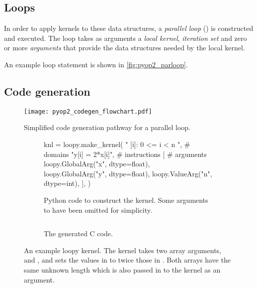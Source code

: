 \documentclass[thesis]{subfiles}
\begin{document}
\subsection{Loops}

In order to apply kernels to these data structures, a \textit{parallel loop} () is constructed and executed.
The loop takes as arguments a \textit{local kernel}, \textit{iteration set} and zero or more \textit{arguments} that provide the data structures needed by the local kernel.




An example loop statement is shown in \cref{fig:pyop2_parloop}.

\subsection{Code generation}
\label{sec:pyop2_codegen}

\begin{figure}
  \texttt{[image: pyop2\_codegen\_flowchart.pdf]}
  \caption{Simplified code generation pathway for a  parallel loop.}
  \label{fig:pyop2_codegen}
\end{figure}

\begin{figure}
  \centering
  \begin{subfigure}{.49\textwidth}
    \begin{pylisting}
      knl = loopy.make_kernel(
        "{ [i]: 0 <= i < n }",  # domains
        "y[i] = 2*x[i]",        # instructions
        [                       # arguments
          loopy.GlobalArg("x", dtype=float),
          loopy.GlobalArg("y", dtype=float),
          loopy.ValueArg("n", dtype=int),
        ],
      )
    \end{pylisting}
    \caption{Python code to construct the kernel. Some arguments to  have been omitted for simplicity.}
    \label{fig:loopy_codegen_kernel}
  \end{subfigure}
  \begin{subfigure}{.49\textwidth}
    \inputminted[fontsize=\footnotesize]{c}{./scripts/artefacts/loopy_example_c_code_tidy.c}
    \caption{The generated C code.}
    \label{fig:loopy_codegen_c}
  \end{subfigure}

  \caption{
    An example loopy kernel.
    The kernel takes two array arguments,  and , and sets the values in  to twice those in .
    Both arrays have the same unknown length  which is also passed in to the kernel as an argument.
  }
  \label{fig:loopy_codegen}
\end{figure}
\end{document}
